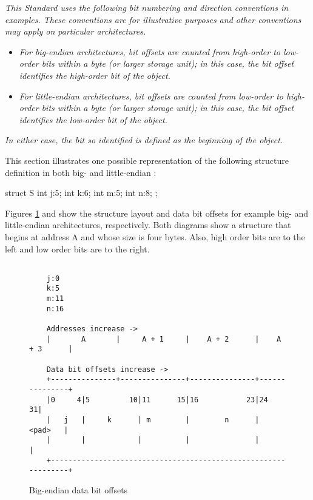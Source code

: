 \textit{This Standard uses the following bit numbering and direction
conventions in examples. These conventions are for illustrative
purposes and other conventions may apply on particular
architectures.}
\begin{itemize}
\item \textit{For big-endian architectures, bit offsets are
counted from high-order to low-order bits within a byte (or
larger storage unit); in this case, the bit offset identifies
the high-order bit of the object.}

\item \textit{For little-endian architectures, bit offsets are
counted from low-order to high-order bits within a byte (or
larger storage unit); in this case, the bit offset identifies
the low-order bit of the object.}
\end{itemize}

\textit{In either case, the bit so identified is defined as the 
beginning of the object.}

This section illustrates one possible representation of the 
following  structure definition in both big- 
and little-endian :
\par %
\begin{nlnlisting}
struct S {
    int j:5;
    int k:6;
    int m:5;
    int n:8;
};
\end{nlnlisting}

Figures \ref{fig:bigendiandatabitoffsets} and
show the structure layout
and data bit offsets for example big- and little-endian
architectures, respectively. Both diagrams show a structure
that begins at address A and whose size is four bytes. Also,
high order bits are to the left and low order bits are to
the right.

\begin{figure}[ht]
\begin{dwflisting}
\begin{verbatim}

    j:0
    k:5
    m:11
    n:16

    Addresses increase ->
    |       A       |     A + 1     |    A + 2      |    A + 3      | 

    Data bit offsets increase ->
    +---------------+---------------+---------------+---------------+
    |0     4|5         10|11      15|16           23|24           31|
    |   j   |     k      | m        |        n      |       <pad>   |
    |       |            |          |               |               | 
    +---------------------------------------------------------------+ 

\end{verbatim}
\end{dwflisting}
\caption{Big-endian data bit offsets}
\label{fig:bigendiandatabitoffsets}
\end{figure}

